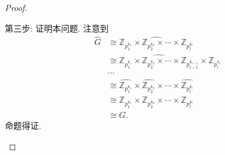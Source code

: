 \documentclass[lang=cn,12pt,a4paper]{elegantpaper.cls}
\begin{document}
\begin{enumerate}
\begin{proof}
\begin{enumerate}
		第三步: 证明本问题. 注意到\[\begin{aligned}
			\hat{G}&\cong \widehat{\mathbb{Z}_{p_1^{k_1}}\times \mathbb{Z}_{p_2^{k_2}}\times \cdots\times \mathbb{Z}_{p_l^{k_l}}}\\&
			\cong \widehat{\mathbb{Z}_{p_{1}^{k_1}}\times \mathbb{Z}_{p_2^{k_2}}\times \cdots\times \mathbb{Z}_{p_{l-1}^{k_{l-1}}}}\times \widehat{\mathbb{Z}_{p_l^{k_l}}}\\
			&\cdots\\
			&\cong \widehat{\mathbb{Z}_{p_1^{k_1}}}\times \widehat{\mathbb{Z}_{p_2^{k_2}}}\times \cdots\times \widehat{\mathbb{Z}_{p_l^{k_l}}}\\
			&\cong \mathbb{Z}_{p_1^{k_1}}\times \mathbb{Z}_{p_2^{k_2}}\times \cdots\times \mathbb{Z}_{p_l^{k_l}}\\
			&\cong G.
		\end{aligned}\]命题得证.
		\end{enumerate}
		
	\end{proof}
	

\end{enumerate}
\end{document}
